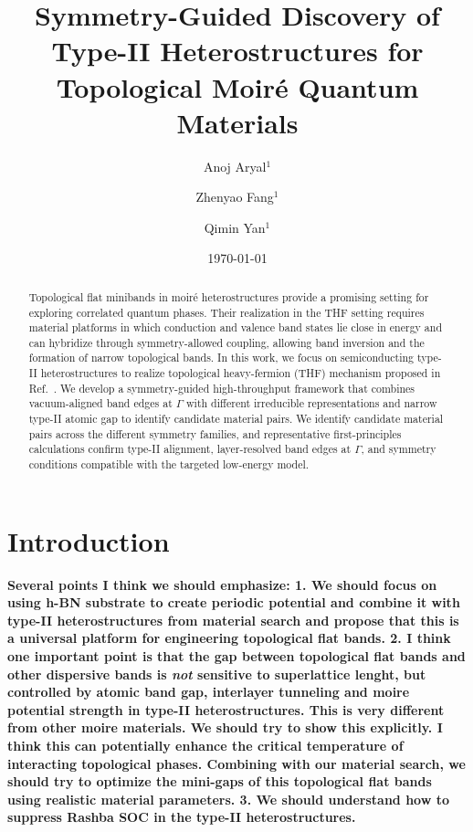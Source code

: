 \documentclass[aps, preprint, prb,]{revtex4-2}
\newcommand{\addCXL}[1]{{\bf \color{red} #1}}
\begin{document}
\title{Symmetry-Guided Discovery of Type-II Heterostructures for Topological Moiré Quantum Materials}
\author{Anoj Aryal$^{1}$}
\author{Zhenyao Fang$^{1}$}
\author{Qimin Yan$^{1}$}
\date{\today}
\begin{abstract}
Topological flat minibands in moir\'e heterostructures provide a promising setting for exploring correlated quantum phases. Their realization in the THF setting requires material platforms in which conduction and valence band states lie close in energy and can hybridize through symmetry-allowed coupling, allowing band inversion and the formation of narrow topological bands. In this work, we focus on semiconducting type-II heterostructures to realize topological heavy-fermion (THF) mechanism proposed in Ref.~\cite{Liu2025IdealTHF}. We develop a symmetry-guided high-throughput framework that combines vacuum-aligned band edges at $\Gamma$ with different irreducible representations and narrow type-II atomic gap to identify candidate material pairs. We identify candidate material pairs across the different symmetry families, and representative first-principles calculations confirm type-II alignment, layer-resolved band edges at $\Gamma$, and symmetry conditions compatible with the targeted low-energy model. 
\end{abstract}
\maketitle

\section{Introduction}
\label{sec:introduction}
\addCXL{Several points I think we should emphasize: 
1. We should focus on using h-BN substrate to create periodic potential and combine it with type-II heterostructures from material search and propose that this is a universal platform for engineering topological flat bands. 
2. I think one important point is that the gap between topological flat bands and other dispersive bands is {\it not} sensitive to superlattice lenght, but controlled by atomic band gap, interlayer tunneling and moire potential strength in type-II heterostructures. This is very different from other moire materials. We should try to show this explicitly. I think this can potentially enhance the critical temperature of interacting topological phases. Combining with our material search, we should try to optimize the mini-gaps of this topological flat bands using realistic material parameters. 3. We should understand how to suppress Rashba SOC in the type-II heterostructures.  
}
\end{document}
